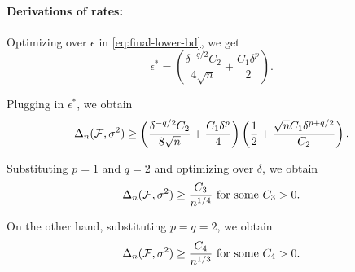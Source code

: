 \paragraph{Derivations of rates:}
 Optimizing over $\epsilon$ in \eqref{eq:final-lower-bd}, we get
 $$\epsilon^* = \left(\dfrac{\delta^{-q/2}C_2}{4\sqrt{n}} + \dfrac{C_1\delta^p}{2}\right).$$

 Plugging in $\epsilon^*$, we obtain
 $$\Delta_n(\mathcal{F}, \sigma^2) 
 \ge \left(\dfrac{\delta^{-q/2}C_2}{8\sqrt{n}} + \dfrac{C_1\delta^p}{4}\right) \left( \dfrac{1}{2} + \dfrac{\sqrt{n}C_1 \delta^{p + q/2}}{C_2} \right).$$

Substituting $p=1$ and $q=2$  and optimizing over $\delta$, we obtain
$$\Delta_n(\mathcal{F}, \sigma^2) \ge \dfrac{C_3}{ n^{1/4}} \text{ for some } C_3>0.$$

On the other hand, substituting $p=q=2$, we obtain
$$\Delta_n(\mathcal{F}, \sigma^2) \ge \dfrac{C_4}{ n^{1/3}} \text{ for some } C_4>0.$$
